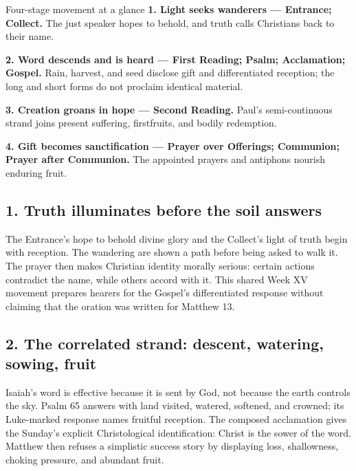 \begin{deepstudy}
\begin{studybox}{Four-stage movement at a glance}
\textbf{1. Light seeks wanderers --- Entrance; Collect.} The just speaker hopes to behold, and truth calls Christians back to their name.\par\smallskip
\textbf{2. Word descends and is heard --- First Reading; Psalm; Acclamation; Gospel.} Rain, harvest, and seed disclose gift and differentiated reception; the long and short forms do not proclaim identical material.\par\smallskip
\textbf{3. Creation groans in hope --- Second Reading.} Paul's semi-continuous strand joins present suffering, firstfruits, and bodily redemption.\par\smallskip
\textbf{4. Gift becomes sanctification --- Prayer over Offerings; Communion; Prayer after Communion.} The appointed prayers and antiphons nourish enduring fruit.
\end{studybox}

\subsection*{1. Truth illuminates before the soil answers\enspace{}}

The Entrance's hope to behold divine glory and the Collect's light of truth begin with reception. The wandering are shown a path before being asked to walk it. The prayer then makes Christian identity morally serious: certain actions contradict the name, while others accord with it. This shared Week XV movement prepares hearers for the Gospel's differentiated response without claiming that the oration was written for Matthew 13.

\subsection*{2. The correlated strand: descent, watering, sowing, fruit\enspace{}}

Isaiah's word is effective because it is sent by God, not because the earth controls the sky. Psalm 65 answers with land visited, watered, softened, and crowned; its Luke-marked response names fruitful reception. The composed acclamation gives the Sunday's explicit Christological identification: Christ is the sower of the word. Matthew then refuses a simplistic success story by displaying loss, shallowness, choking pressure, and abundant fruit.


\end{deepstudy}
